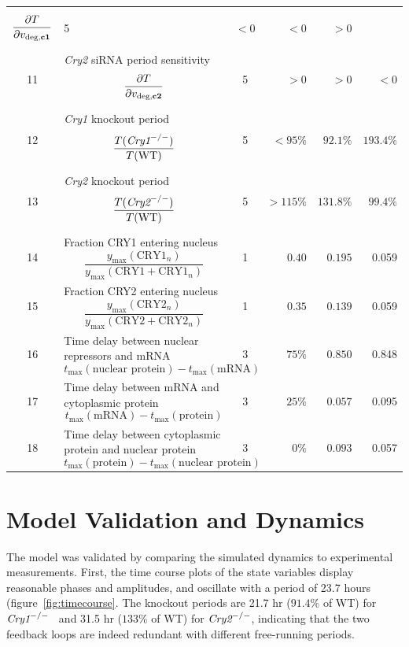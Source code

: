 \begin{longtable}{cp{6.0cm}crrr}
$$\frac{\partial T}{\partial v_{\text{deg,{\bf c1}}}}$$
& 5 & $< 0$ & $< 0$ & $> 0$ \\
%
11 & {\it Cry2} siRNA period sensitivity 
$$\frac{\partial T}{\partial v_{\text{deg,{\bf c2}}}}$$
& 5 & $> 0$ & $> 0$ & $< 0$ \\
%
12 & {\it Cry1} knockout period 
$$\frac{T(\text{\it Cry1}^{-/-})}{T(\text{WT})}$$
& 5 & $< 95 \%$ & $92.1 \%$ & $193.4 \%$ \\
%
13 & {\it Cry2} knockout period 
$$\frac{T(\text{\it Cry2}^{-/-})}{T(\text{WT})}$$
& 5 & $> 115 \%$ & $131.8 \% $ & $99.4 \%$ \\
%
14 & Fraction CRY1 entering nucleus 
$$\frac{y_\text{max}(\text{CRY1}_n)}{y_\text{max}(\text{CRY1} + \text{CRY1}_n)}$$
& 1 & $0.40$ & $0.195$ & 0.059 \\
%
15 & Fraction CRY2 entering nucleus 
$$\frac{y_\text{max}(\text{CRY2}_n)}{y_\text{max}(\text{CRY2} + \text{CRY2}_n)}$$
& 1 & $0.35$ & $0.139$ & 0.059 \\
%
16 & Time delay between nuclear repressors and mRNA 
$$t_\text{max}(\text{nuclear protein}) - t_\text{max}(\text{mRNA})$$
& 3 & $75 \%$ & $0.850$ & 0.848 \\
%
17 & Time delay between mRNA and cytoplasmic protein
$$t_\text{max}(\text{mRNA}) - t_\text{max}(\text{protein})$$ 
& 3 & $25 \%$ & $0.057$ & 0.095 \\
%
18 & Time delay between cytoplasmic protein and nuclear protein
$$t_\text{max}(\text{protein}) - t_\text{max}(\text{nuclear protein})$$
& 3 & $0 \%$ & $0.093$ & 0.057 \\
  \end{longtable}


  \section{Model Validation and Dynamics}
  The model was validated by comparing the simulated dynamics to experimental measurements. First, the time course plots of the state variables display reasonable phases and amplitudes, and oscillate with a period of 23.7 hours (figure~\ref{fig:timecourse}. The knockout periods are 21.7 hr ($91.4\%$ of WT) for $\text{\it Cry1}^{-/-}$  and 31.5 hr ($133\%$ of WT) for $\text{\it Cry2}^{-/-}$, indicating that the two feedback loops are indeed redundant with different free-running periods.

